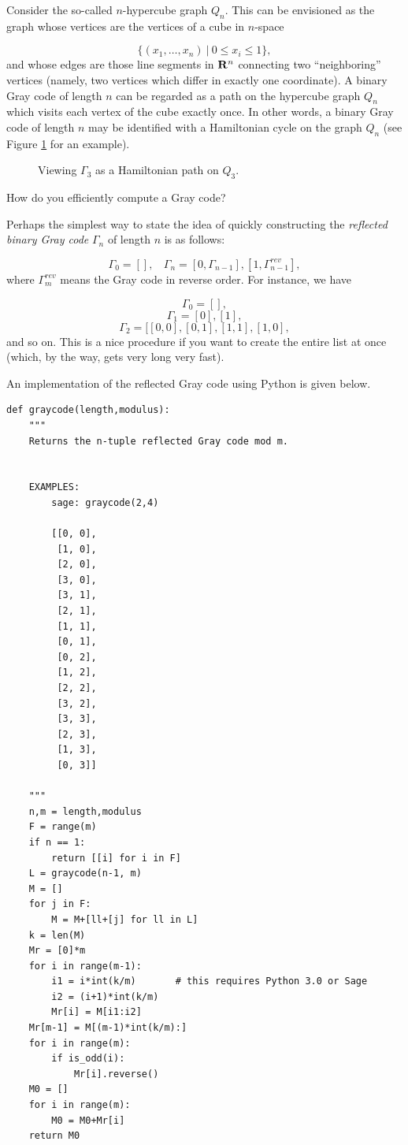 Consider the so-called $n$-hypercube graph
$Q_n$. This can be envisioned as the graph whose
vertices are the vertices of a cube in
$n$-space

\[
\{(x_1,\dots,x_n)\ |\ 0\leq x_i\leq 1\},
\]
and whose edges are those line segments in
$\mathbf{R}^n$ connecting two ``neighboring''
vertices (namely, two vertices which differ
in exactly one coordinate).
A binary Gray code of length $n$ can be regarded as a
path on the hypercube graph $Q_n$ which visits
each vertex of the cube exactly once.
In other words, a binary Gray code of length $n$
may be identified with a
Hamiltonian cycle on the graph $Q_n$
(see Figure \ref{fig:trees_forests:gray_code_cube} for an example).

\begin{figure}[!htbp]
\centering

\caption{Viewing $\Gamma_3$ as a Hamiltonian path on $Q_3$.}
\label{fig:trees_forests:gray_code_cube}
\end{figure}


How do you efficiently compute a Gray code?

Perhaps the simplest way to state the idea of
quickly constructing
the {\it reflected binary Gray code} $\Gamma_n$
of length $n$ is as follows:

\[
\Gamma_0=[],\ \ \ \
\Gamma_{n}=[0,\Gamma_{n-1}],[1,\Gamma_{n-1}^{rev}],
\]
where $\Gamma_m^{rev}$ means the Gray code in
reverse order. For instance, we have

\[
\Gamma_0=[],
\]
\[
\Gamma_1 = [0], [1],
\]
\[
\Gamma_2=[[0,0],[0,1],[1,1],[1,0],
\]
and so on. This is a nice procedure if you want to create
the entire list at once (which, by the way, gets very long
very fast).

An implementation of the reflected Gray code using Python is given below.

\begin{lstlisting}
def graycode(length,modulus):
    """
    Returns the n-tuple reflected Gray code mod m.


    EXAMPLES:
        sage: graycode(2,4)

        [[0, 0],
         [1, 0],
         [2, 0],
         [3, 0],
         [3, 1],
         [2, 1],
         [1, 1],
         [0, 1],
         [0, 2],
         [1, 2],
         [2, 2],
         [3, 2],
         [3, 3],
         [2, 3],
         [1, 3],
         [0, 3]]

    """
    n,m = length,modulus
    F = range(m)
    if n == 1:
        return [[i] for i in F]
    L = graycode(n-1, m)
    M = []
    for j in F:
        M = M+[ll+[j] for ll in L]
    k = len(M)
    Mr = [0]*m
    for i in range(m-1):
        i1 = i*int(k/m)       # this requires Python 3.0 or Sage
        i2 = (i+1)*int(k/m)
        Mr[i] = M[i1:i2]
    Mr[m-1] = M[(m-1)*int(k/m):]
    for i in range(m):
        if is_odd(i):
            Mr[i].reverse()
    M0 = []
    for i in range(m):
        M0 = M0+Mr[i]
    return M0
\end{lstlisting}

